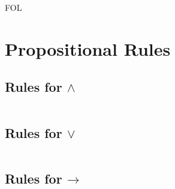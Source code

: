\documentclass[10pt,a4paper]{article}
\theoremstyle{plain}
\theoremstyle{definition}
\theoremstyle{remark}
\newcommand*{\olfileid}[3]{}
\newcommand*{\olsection}[1]{\section*{#1}}
\providecommand{\AxiomC}[1]{}
\providecommand{\UnaryInfC}[1]{}
\providecommand{\BinaryInfC}[1]{}
\providecommand{\TrinaryInfC}[1]{}
\providecommand{\RightLabel}[1]{}
\providecommand{\DisplayProof}{}
\providecommand{\lif}{\mathbin{\rightarrow}}
\providecommand{\iftag}[1]{#1}
\providecommand{\Elim}[1]{}
\providecommand{\Intro}[1]{}
\providecommand{\Discharge}{\mathrm{Dis}}
\providecommand{\Intro}{\mathrm{I}}
\begin{document}



\iftag{FOL}
      {\olfileid{fol}{ntd}{prl}}
      {\olfileid{pl}{ntd}{prl}}

\olsection{Propositional Rules}


\subsection{Rules for $\land$}

\begin{defish}
\AxiomC{$!A$}
\AxiomC{$!B$}
\RightLabel{\Intro{\land}}
\BinaryInfC{$!A \land !B$}
\DisplayProof
\hfill
\begin{tabular}{r}
\AxiomC{$!A \land !B$}
\RightLabel{\Elim{\land}}
\UnaryInfC{$!A$}
\DisplayProof
\\[3ex]
\AxiomC{$!A \land !B$}
\RightLabel{\Elim{\land}}
\UnaryInfC{$!B$}
\DisplayProof
\end{tabular}
\end{defish}

\subsection{Rules for $\lor$}

\begin{defish}
\begin{tabular}{r}
\AxiomC{$!A$}
\RightLabel{\Intro{\lor}}
\UnaryInfC{$!A \lor !B$}
\DisplayProof
\\[3ex]
\AxiomC{$!B$}
\RightLabel{\Intro{\lor}}
\UnaryInfC{$!A \lor !B$}
\DisplayProof
\end{tabular}
\hfill
\AxiomC{$!A \lor !B$}
\AxiomC{$\Discharge{!A}{n}$}
\AxiomC{$\Discharge{!B}{n}$}
\DischargeRule{\Elim{\lor}}{n}
\TrinaryInfC{$!C$}
\DisplayProof
\end{defish}

\subsection{Rules for $\lif$}

\begin{defish}
\AxiomC{$\Discharge{!A}{n}$}
\DischargeRule{\Intro{\lif}}{n}
\UnaryInfC{$!A \lif !B$}
\DisplayProof
\hfill
\AxiomC{$!A \lif !B$}
\AxiomC{$!A$}
\RightLabel{\Elim{\lif}}
\BinaryInfC{$!B$}
\DisplayProof
\end{defish}
\end{document}
